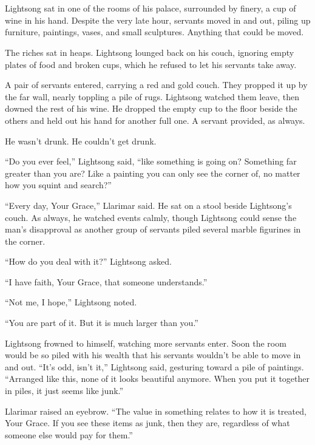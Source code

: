 \chapter{}

Lightsong sat in one of the rooms of his palace, surrounded by finery, a cup of wine in his hand. Despite the very late hour, servants moved in and out, piling up furniture, paintings, vases, and small sculptures. Anything that could be moved.

The riches sat in heaps. Lightsong lounged back on his couch, ignoring empty plates of food and broken cups, which he refused to let his servants take away.

A pair of servants entered, carrying a red and gold couch. They propped it up by the far wall, nearly toppling a pile of rugs. Lightsong watched them leave, then downed the rest of his wine. He dropped the empty cup to the floor beside the others and held out his hand for another full one. A servant provided, as always.

He wasn’t drunk. He couldn’t get drunk.

“Do you ever feel,” Lightsong said, “like something is going on? Something far greater than you are? Like a painting you can only see the corner of, no matter how you squint and search?”

“Every day, Your Grace,” Llarimar said. He sat on a stool beside Lightsong’s couch. As always, he watched events calmly, though Lightsong could sense the man’s disapproval as another group of servants piled several marble figurines in the corner.

“How do you deal with it?” Lightsong asked.

“I have faith, Your Grace, that someone understands.”

“Not me, I hope,” Lightsong noted.

“You are part of it. But it is much larger than you.”

Lightsong frowned to himself, watching more servants enter. Soon the room would be so piled with his wealth that his servants wouldn’t be able to move in and out. “It’s odd, isn’t it,” Lightsong said, gesturing toward a pile of paintings. “Arranged like this, none of it looks beautiful anymore. When you put it together in piles, it just seems like junk.”

Llarimar raised an eyebrow. “The value in something relates to how it is treated, Your Grace. If you see these items as junk, then they are, regardless of what someone else would pay for them.”

